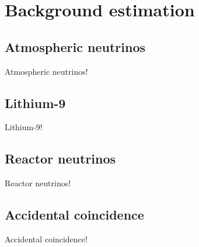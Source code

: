 
%
%

\section{Background estimation}\label{Section_Background}

\subsection{Atmospheric neutrinos}
\vs\hs Atmospheric neutrinos!

\subsection{Lithium-9}
\vs\hs Lithium-9!

\subsection{Reactor neutrinos}
\vs\hs Reactor neutrinos!

\subsection{Accidental coincidence}
\vs\hs Accidental coincidence!

\newpage
